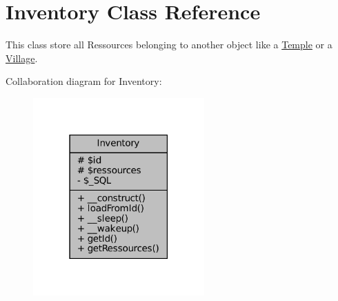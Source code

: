 \hypertarget{classInventory}{}\section{Inventory Class Reference}
\label{classInventory}


This class store all Ressources belonging to another object like a \mbox{\hyperlink{classTemple}{Temple}} or a \mbox{\hyperlink{classVillage}{Village}}.  




Collaboration diagram for Inventory\+:
\nopagebreak
\begin{figure}[H]
\begin{center}
\leavevmode
\includegraphics[width=186pt]{classInventory__coll__graph}
\end{center}
\end{figure}

